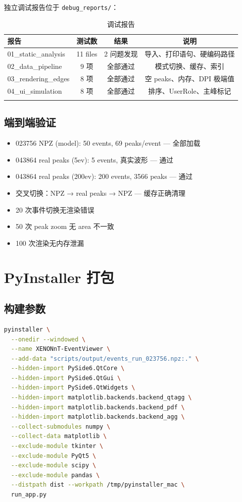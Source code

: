 \documentclass[12pt,a4paper]{article}
\begin{document}
独立调试报告位于 \texttt{debug\_reports/}：

\begin{longtable}{|l|c|c|c|}
\hline
\textbf{报告} & \textbf{测试数} & \textbf{结果} & \textbf{说明} \\
\hline
01\_static\_analysis & 11 files & 2 问题发现 & 导入、打印语句、硬编码路径 \\
02\_data\_pipeline & 9 项 & 全部通过 & 模式切换、缓存、索引 \\
03\_rendering\_edges & 8 项 & 全部通过 & 空 peaks、内存、DPI 极端值 \\
04\_ui\_simulation & 8 项 & 全部通过 & 排序、UserRole、主峰标记 \\
\hline
\caption{调试报告}
\end{longtable}

\subsection{端到端验证}

\begin{itemize}[itemsep=2pt]
\item 023756 NPZ (model): 50 events, 69 peaks/event — 全部加载
\item 043864 real peaks (5ev): 5 events, 真实波形 — 通过
\item 043864 real peaks (200ev): 200 events, 3566 peaks — 通过
\item 交叉切换：NPZ → real peaks → NPZ — 缓存正确清理
\item 20 次事件切换无渲染错误
\item 50 次 peak zoom 无 area 不一致
\item 100 次渲染无内存泄漏
\end{itemize}

\section{PyInstaller 打包}

\subsection{构建参数}

\begin{lstlisting}[language=bash]
pyinstaller \
  --onedir --windowed \
  --name XENONnT-EventViewer \
  --add-data "scripts/output/events_run_023756.npz:." \
  --hidden-import PySide6.QtCore \
  --hidden-import PySide6.QtGui \
  --hidden-import PySide6.QtWidgets \
  --hidden-import matplotlib.backends.backend_qtagg \
  --hidden-import matplotlib.backends.backend_pdf \
  --hidden-import matplotlib.backends.backend_agg \
  --collect-submodules numpy \
  --collect-data matplotlib \
  --exclude-module tkinter \
  --exclude-module PyQt5 \
  --exclude-module scipy \
  --exclude-module pandas \
  --distpath dist --workpath /tmp/pyinstaller_mac \
  run_app.py
\end{lstlisting}
\end{document}
